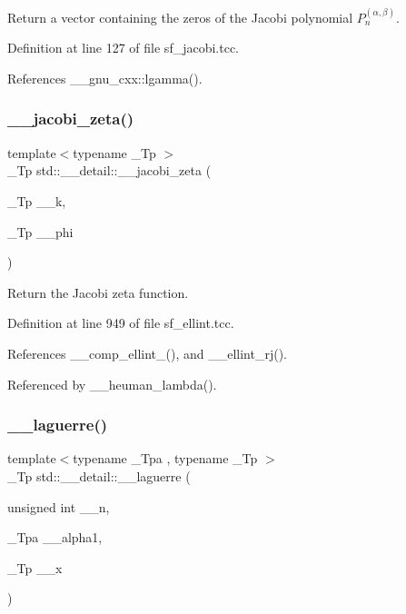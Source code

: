 Return a vector containing the zeros of the Jacobi polynomial $ P_n^{(\alpha,\beta)}$. 

Definition at line 127 of file sf\+\_\+jacobi.\+tcc.



References \+\_\+\+\_\+gnu\+\_\+cxx\+::lgamma().

\mbox{\label{namespacestd_1_1____detail_a1d5fc69202703d72974c4370fd7ade03}} 
\subsubsection{\texorpdfstring{\+\_\+\+\_\+jacobi\+\_\+zeta()}{\_\_jacobi\_zeta()}}
{\footnotesize\ttfamily template$<$typename \+\_\+\+Tp $>$ \\
\+\_\+\+Tp std\+::\+\_\+\+\_\+detail\+::\+\_\+\+\_\+jacobi\+\_\+zeta (\begin{DoxyParamCaption}\item[{\+\_\+\+Tp}]{\+\_\+\+\_\+k,  }\item[{\+\_\+\+Tp}]{\+\_\+\+\_\+phi }\end{DoxyParamCaption})}

Return the Jacobi zeta function. 

Definition at line 949 of file sf\+\_\+ellint.\+tcc.



References \+\_\+\+\_\+comp\+\_\+ellint\+\_(), and \+\_\+\+\_\+ellint\+\_\+rj().



Referenced by \+\_\+\+\_\+heuman\+\_\+lambda().

\mbox{\label{namespacestd_1_1____detail_a9e0b69452cb6c0ca0115c516afd46816}} 
\subsubsection{\texorpdfstring{\+\_\+\+\_\+laguerre()}{\_\_laguerre()}\hspace{0.1cm}{\footnotesize\ttfamily [1/2]}}
{\footnotesize\ttfamily template$<$typename \+\_\+\+Tpa , typename \+\_\+\+Tp $>$ \\
\+\_\+\+Tp std\+::\+\_\+\+\_\+detail\+::\+\_\+\+\_\+laguerre (\begin{DoxyParamCaption}\item[{unsigned int}]{\+\_\+\+\_\+n,  }\item[{\+\_\+\+Tpa}]{\+\_\+\+\_\+alpha1,  }\item[{\+\_\+\+Tp}]{\+\_\+\+\_\+x }\end{DoxyParamCaption})}



